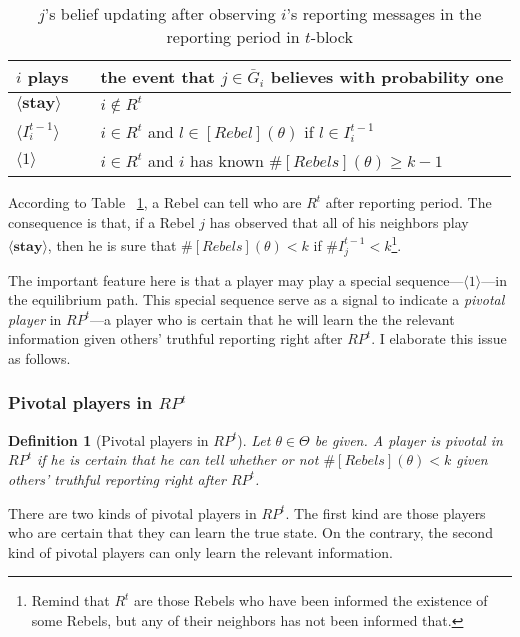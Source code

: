 \documentclass[12pt,letter]{article}
\newtheorem{definition}{Definition}[section]
\theoremstyle{definition}
\theoremstyle{remark}
\theoremstyle{claim}
\begin{document}
\begin{table}[ht]
\caption{$j$'s belief updating after observing $i$'s reporting messages in the reporting period in $t$-block}
\label{Table_blf_up_reporting}
\begin{center}
\begin{tabular}{l c l}
$i$ plays 		&  			& the event that $j\in \bar{G}_i$ believes with probability one  \\
\hline
$\langle  \textbf{stay} \rangle$ 	& 			    & $i\notin R^t$  \\
$\langle  {I^{t-1}_i} \rangle$ 		&  			& $i\in R^t$ and $l\in [Rebel](\theta)$ if $l\in I^{t-1}_i$      \\
$\langle 1 \rangle$ 		             &  			& $i\in R^t$ and $i$ has known $\#[Rebels](\theta)\geq k-1$ \\
\end{tabular}
\end{center}
\end{table}

According to Table ~\ref{Table_blf_up_reporting}, a Rebel can tell who are $R^t$ after reporting period. The consequence is that, if a Rebel $j$ has observed that all of his neighbors play $\langle  \textbf{stay} \rangle$, then he is sure that $\#[Rebels](\theta)< k$ if $\#I^{t-1}_j<k$\footnote{Remind that $R^t$ are those Rebels who have been informed the existence of some Rebels, but any of their neighbors has not been informed that.}. 

The important feature here is that a player may play a special sequence---$\langle 1 \rangle$---in the equilibrium path. This special sequence serve as a signal to indicate a \textit{pivotal player} in $RP^t$---a player who is certain that he will learn the the relevant information given others' truthful reporting right after $RP^t$. I elaborate this issue as follows.


\subsubsection*{Pivotal players in $RP^t$}
\begin{definition}[Pivotal players in $RP^t$]
Let $\theta\in \Theta$ be given. A player is pivotal in $RP^t$ if he is certain that he can tell whether or not $\#[Rebels](\theta)< k$ given others' truthful reporting right after $RP^t$.
\end{definition}
There are two kinds of pivotal players in $RP^t$. The first kind are those players who are certain that they can learn the true state. On the contrary, the second kind of pivotal players can only learn the relevant information.
\end{document}
